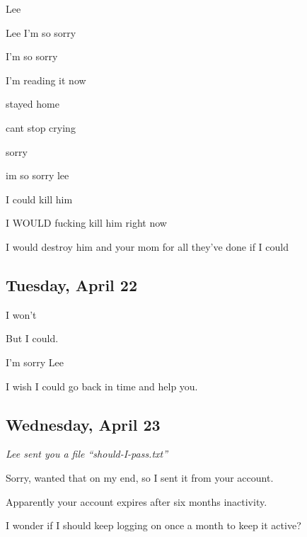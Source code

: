 { Lee

 Lee I'm so sorry

 I'm so sorry

 I'm reading it now

 stayed home

 cant stop crying

 sorry

 im so sorry lee

 I could kill him

 I WOULD fucking kill him right now

 I would destroy him and your mom for all they've done if I could

\newpage

\subsection*{Tuesday, April 22}\label{tuesday-april-22}

 I won't

 But I could.

 I'm sorry Lee

 I wish I could go back in time and help you.

\newpage

\subsection*{Wednesday, April 23}\label{wednesday-april-23}

\begin{flushright}
\emph{Lee sent you a file ``should-I-pass.txt''}
\end{flushright}

 Sorry, wanted that on my end, so I sent it from your account.

 Apparently your account expires after six months inactivity.

 I wonder if I should keep logging on once a month to keep it active?

}

